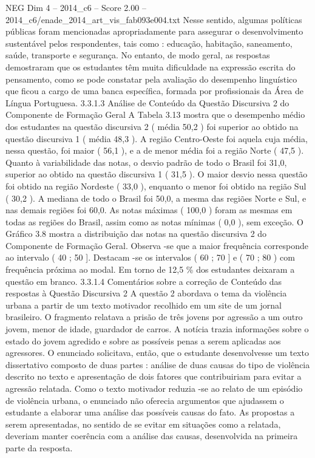 \begin{textsample}{NEG Dim 4 – 2014\_c6 – Score 2.00 – 2014\_c6/enade\_2014\_art\_vis\_fab093e004.txt}
Nesse sentido, algumas políticas públicas foram mencionadas apropriadamente para assegurar o desenvolvimento sustentável pelos respondentes, tais como : educação, habitação, saneamento, saúde, transporte e segurança.
No entanto, de modo geral, as respostas demostraram que os estudantes têm muita dificuldade na expressão escrita do pensamento, como se pode constatar pela avaliação do desempenho linguístico que ficou a cargo de uma banca específica, formada por profissionais da Área de Língua Portuguesa. 3.3.1.3 Análise de Conteúdo da Questão Discursiva 2 do Componente de Formação Geral A Tabela 3.13 mostra que o desempenho médio dos estudantes na questão discursiva 2 ( média 50,2 ) foi superior ao obtido na questão discursiva 1 ( média 48,3 ).
A região Centro-Oeste foi aquela cuja média, nessa questão, foi maior ( 56,1 ), e a de menor média foi a região Norte ( 47,5 ).
Quanto à variabilidade das notas, o desvio padrão de todo o Brasil foi 31,0, superior ao obtido na questão discursiva 1 ( 31,5 ).
O maior desvio nessa questão foi obtido na região Nordeste ( 33,0 ), enquanto o menor foi obtido na região Sul ( 30,2 ).
A mediana de todo o Brasil foi 50,0, a mesma das regiões Norte e Sul, e nas demais regiões foi 60,0.
As notas máximas ( 100,0 ) foram as mesmas em todas as regiões do Brasil, assim como as notas mínimas ( 0,0 ), sem exceção.
O Gráfico 3.8 mostra a distribuição das notas na questão discursiva 2 do Componente de Formação Geral.
Observa -se que a maior frequência corresponde ao intervalo ( 40 ; 50 ].
Destacam -se os intervalos ( 60 ; 70 ] e ( 70 ; 80 ) com frequência próxima ao modal.
Em torno de 12,5 \% dos estudantes deixaram a questão em branco. 3.3.1.4 Comentários sobre a correção de Conteúdo das respostas à Questão Discursiva 2 A questão 2 abordava o tema da violência urbana a partir de um texto motivador recolhido em um site de um jornal brasileiro.
O fragmento relatava a prisão de três jovens por agressão a um outro jovem, menor de idade, guardador de carros.
A notícia trazia informações sobre o estado do jovem agredido e sobre as possíveis penas a serem aplicadas aos agressores.
O enunciado solicitava, então, que o estudante desenvolvesse um texto dissertativo composto de duas partes : análise de duas causas do tipo de violência descrito no texto e apresentação de dois fatores que contribuiriam para evitar a agressão relatada.
Como o texto motivador reduzia -se ao relato de um episódio de violência urbana, o enunciado não oferecia argumentos que ajudassem o estudante a elaborar uma análise das possíveis causas do fato.
As propostas a serem apresentadas, no sentido de se evitar em situações como a relatada, deveriam manter coerência com a análise das causas, desenvolvida na primeira parte da resposta.

\end{textsample}
